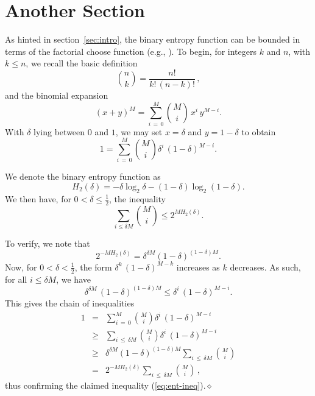 \documentclass[11pt]{article}
\begin{document}

\section{Another Section}

As hinted in section~\ref{sec:intro}, the binary entropy function can be bounded in terms of the factorial choose function (e.g., \cite[lemma 2.3.5, p.~33]{gray}). To begin, for integers $k$ and $n$, with $k \le n$, we recall the basic definition
$$
{n \choose k} = \frac{n!}{k! \, (n-k)!}\, ,
$$
and the binomial expansion
$$
(x + y)^M = \sum_{i\,=\,0}^M {M\choose i}\, x^i\, y^{M-i}.
$$
With $\delta$ lying between $0$ and $1$, we may set $x = \delta$ and $y = 1-\delta$
to obtain
$$
1 = \sum_{i\,=\,0}^M {M\choose i} \delta^i\, (1 - \delta)^{M-i}.
$$

We denote the binary entropy function
as
$$
H_2(\delta) = -\delta\log_2\delta - (1 - \delta)\log_2(1 - \delta).
$$
We then have, for $0 < \delta \le \frac{1}{2}$, the inequality
\begin{equation}
 \sum_{i\le \delta M} {M\choose i} \le 2^{M H_2(\delta)}.
 \label{eq:ent-ineq}
\end{equation}


To verify, we note that
$$
2^{-M H_2(\delta)} = \delta^{\delta M} (1 - \delta)^{(1 - \delta)M}.
$$
Now, for $0 < \delta < \frac{1}{2}$, the form
$\delta^k\, (1 - \delta)^{M-k}$ increases as $k$ decreases.
As such, for all $i \le \delta M$, we have
$$
\delta^{\delta M}\,(1 - \delta)^{(1 - \delta)M} \le
 \delta^i\, (1 - \delta)^{M-i} .
$$
This gives the chain of inequalities
\begin{eqnarray*}
 1 &=&
 \sum_{i\,=\,0}^M {M\choose i} \delta^i\, (1 - \delta)^{M-i} 
\\
 &\ge& 
 \sum_{i\,\le\,\delta M} {M\choose i} \delta^i\,(1 - \delta)^{M-i}
\\
 &\ge&
\delta^{\delta M}(1 - \delta)^{(1-\delta)M} \sum_{i\,\le\,\delta M} {M\choose i}
\\
 &=&
 2^{-M H_2(\delta)} \sum_{i\,\le\,\delta M} {M\choose i}\, ,
\end{eqnarray*}
thus confirming the claimed inequality (\ref{eq:ent-ineq}).\hfill$\diamond$
\end{document}
